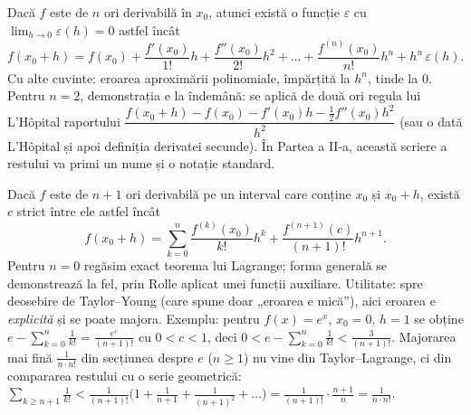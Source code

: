 \begin{teorema}
Dacă $f$ este de $n$ ori derivabilă în $x_0$, atunci există o funcție $\varepsilon$ cu $\lim_{h\to0}\varepsilon(h)=0$ astfel încât
\[
f(x_0+h)=f(x_0)+\frac{f'(x_0)}{1!}h+\frac{f''(x_0)}{2!}h^2+\dots+\frac{f^{(n)}(x_0)}{n!}h^n+h^n\,\varepsilon(h).
\]
Cu alte cuvinte: eroarea aproximării polinomiale, împărțită la $h^n$, tinde la $0$. Pentru $n=2$, demonstrația e la îndemână: se aplică de două ori regula lui L'Hôpital raportului $\dfrac{f(x_0+h)-f(x_0)-f'(x_0)h-\frac12f''(x_0)h^2}{h^2}$ (sau o dată L'Hôpital și apoi definiția derivatei secunde). În Partea a II-a, această scriere a restului va primi un nume și o notație standard.
\end{teorema}

\begin{teorema}
Dacă $f$ este de $n+1$ ori derivabilă pe un interval care conține $x_0$ și $x_0+h$, există $c$ strict între ele astfel încât
\[
f(x_0+h)=\sum_{k=0}^{n}\frac{f^{(k)}(x_0)}{k!}h^k+\frac{f^{(n+1)}(c)}{(n+1)!}h^{n+1}.
\]
Pentru $n=0$ regăsim exact teorema lui Lagrange; forma generală se demonstrează la fel, prin Rolle aplicat unei funcții auxiliare. Utilitate: spre deosebire de Taylor--Young (care spune doar „eroarea e mică''), aici eroarea e \emph{explicită} și se poate majora. Exemplu: pentru $f(x)=e^x$, $x_0=0$, $h=1$ se obține $e-\sum_{k=0}^{n}\frac1{k!}=\frac{e^c}{(n+1)!}$ cu $0<c<1$, deci $0<e-\sum_{k=0}^{n}\frac1{k!}<\frac{3}{(n+1)!}$. Majorarea mai fină $\frac{1}{n\cdot n!}$ din secțiunea despre $e$ ($n\ge1$) nu vine din Taylor--Lagrange, ci din compararea restului cu o serie geometrică: $\sum_{k\ge n+1}\frac1{k!}<\frac1{(n+1)!}\big(1+\frac1{n+1}+\frac1{(n+1)^2}+\dots\big)=\frac1{(n+1)!}\cdot\frac{n+1}{n}=\frac{1}{n\cdot n!}$.
\end{teorema}


